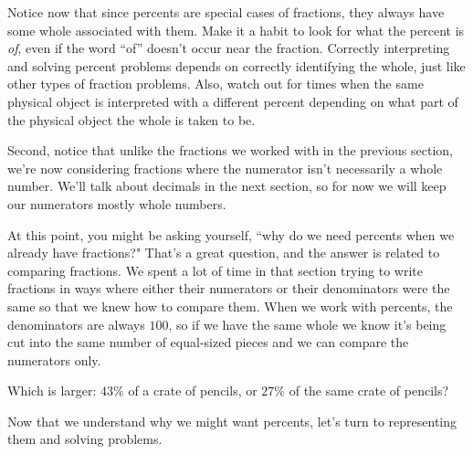 \documentclass{ximera}
\begin{document}
Notice now that since percents are special cases of fractions, they always have some whole associated with them. Make it a habit to look for what the percent is \emph{of}, even if the word ``of'' doesn't occur near the fraction. Correctly interpreting and solving percent problems depends on correctly identifying the whole, just like other types of fraction problems. Also, watch out for times when the same physical object is interpreted with a different percent depending on what part of the physical object the whole is taken to be.

Second, notice that unlike the fractions we worked with in the previous section, we're now considering fractions where the numerator isn't necessarily a whole number.  We'll talk about decimals in the next section, so for now we will keep our numerators mostly whole numbers.

At this point, you might be asking yourself, ``why do we need percents when we already have fractions?" That's a great question, and the answer is related to comparing fractions. We spent a lot of time in that section trying to write fractions in ways where either their numerators or their denominators were the same so that we knew how to compare them. When we work with percents, the denominators are always $100$, so if we have the same whole we know it's being cut into the same number of equal-sized pieces and we can compare the numerators only.

\begin{question}
Which is larger: $43\%$ of a crate of pencils, or $27\%$ of the same crate of pencils?

\begin{multipleChoice}
\end{multipleChoice}
\end{question}

Now that we understand why we might want percents, let's turn to representing them and solving problems.
\end{document}
